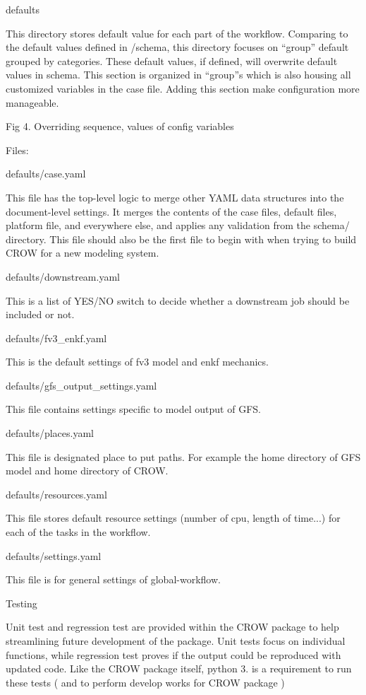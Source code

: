 defaults

This directory stores default value for each part of the workflow. Comparing to the default values defined in /schema, this directory focuses on “group” default grouped by categories. These default values, if defined, will overwrite default values in schema. This section is organized in “group”s which is also housing all customized variables in the case file. Adding this section make configuration more manageable.

Fig 4. Overriding sequence, values of config variables

Files\-:

defaults/case.\-yaml

This file has the top-\/level logic to merge other Y\-A\-M\-L data structures into the document-\/level settings. It merges the contents of the case files, default files, platform file, and everywhere else, and applies any validation from the schema/ directory. This file should also be the first file to begin with when trying to build C\-R\-O\-W for a new modeling system.

defaults/downstream.\-yaml

This is a list of Y\-E\-S/\-N\-O switch to decide whether a downstream job should be included or not.

defaults/fv3\-\_\-enkf.\-yaml

This is the default settings of fv3 model and enkf mechanics.

defaults/gfs\-\_\-output\-\_\-settings.\-yaml

This file contains settings specific to model output of G\-F\-S.

defaults/places.\-yaml

This file is designated place to put paths. For example the home directory of G\-F\-S model and home directory of C\-R\-O\-W.

defaults/resources.\-yaml

This file stores default resource settings (number of cpu, length of time...) for each of the tasks in the workflow.

defaults/settings.\-yaml

This file is for general settings of global-\/workflow.

Testing

Unit test and regression test are provided within the C\-R\-O\-W package to help streamlining future development of the package. Unit tests focus on individual functions, while regression test proves if the output could be reproduced with updated code. Like the C\-R\-O\-W package itself, python 3. is a requirement to run these tests ( and to perform develop works for C\-R\-O\-W package )


